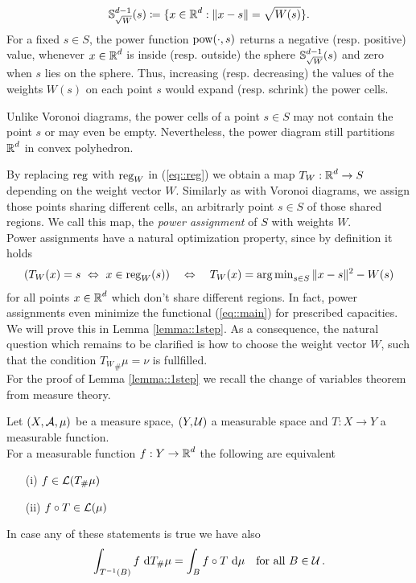 \documentclass[
     12pt,         %
     a4paper,      %
     BCOR=10mm,     %
     DIV=14,        %
     ]{scrreprt}
\begin{document}
    \[\operatorname{\mathbb{S}}_{\sqrt W}^{d-1}(s) \coloneqq \{x \in \operatorname{\mathbb{R}}^d : \| x-s \| = \sqrt{W(s)} \}. \]
    For a fixed $s\in S$, the power function $\operatorname{pow}(\cdot, s)$ returns a negative (resp. positive) value, whenever $x\in \operatorname{\mathbb{R}}^d$ is inside 
    (resp. outside) the sphere $\operatorname{\mathbb{S}}_{\sqrt W}^{d-1}(s)$ and zero when $s$ lies on the sphere. Thus, increasing (resp. decreasing) the values of the weights $W(s)$ on each point $s$ would expand (resp. schrink)
    the power cells. 
    \begin{rem}
        Unlike Voronoi diagrams, the power cells of a point $s\in S$ may not contain the point $s$ or may even be empty. Nevertheless, the power diagram still partitions $\operatorname{\mathbb{R}}^d$ in 
        convex polyhedron.
    \end{rem}
    By replacing $\operatorname{reg}$ with $\operatorname{reg}_W$ in (\ref{eq::reg}) we obtain a map $T_W: \operatorname{\mathbb{R}}^d \to S$ depending on the weight vector $W$.  Similarly as with Voronoi diagrams, we assign those points sharing
    different cells, an arbitrarly point $s\in S$ of those shared regions. We call this map, the \textit{power assignment} of $S$ with weights $W$. \\
    Power assignments have a natural optimization property, since by definition it holds 
    \begin{align}
        ( T_W(x) = s \  \Leftrightarrow \ x\in \operatorname{reg}_W(s) ) \quad \Leftrightarrow \quad T_W(x) = \operatorname{arg\,min}_{s\in S} \|x-s\|^2 - W(s) \label{eq::minimalityPower}
    \end{align}
    for all points $x \in \operatorname{\mathbb{R}}^d$ which don't share different regions. In fact, power assignments even minimize the functional (\ref{eq::main}) for prescribed capacities.
    We will prove this in Lemma \ref{lemma::1step}. As a consequence, the natural question which remains to be clarified is how to choose the weight vector $W$, such that the condition
    ${T_{W}}_{\#}\mu = \nu$ is fullfilled.\\[8pt]
    \indent For the proof of Lemma \ref{lemma::1step} we recall the change of variables theorem from measure theory. 
    \begin{thm*}
         Let $(X, \operatorname{\mathcal{A}}, \mu)$ be a measure space, $(Y, \operatorname{\mathcal{U}})$ a measurable space and $T: X \to Y $ a measurable function.\\
         For a measurable function $f : Y \to \operatorname{\mathbb{R}}^d $ the following are equivalent
         \begin{itemize}
             \item[(i)] $f\in \operatorname{\mathcal{L}}(T_\#\mu)$ 
             \item[(ii)]  $f \circ T \in \operatorname{\mathcal{L}}(\mu) $ 
        \end{itemize}         
        In case any of these statements is true we have also
         \begin{align} \label{eq::transformel}
             \int_{T^{-1}(B)} f \ {\operatorname{{\mathrm{d}}}} T_{\#}\mu = \int_{B} f \circ T \ {\operatorname{{\mathrm{d}}}} \mu \quad \text{for all } B\in \operatorname{\mathcal{U}}.
         \end{align}
    \end{thm*}
\end{document}
